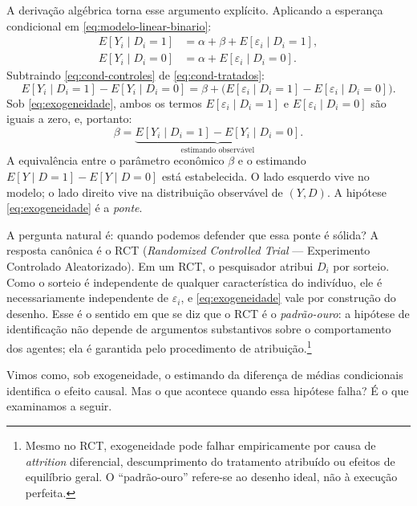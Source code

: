 A derivação algébrica torna esse argumento explícito. Aplicando a esperança condicional em \eqref{eq:modelo-linear-binario}:
\begin{align}
E[Y_i \mid D_i = 1] &= \alpha + \beta + E[\varepsilon_i \mid D_i = 1], \label{eq:cond-tratados}\\
E[Y_i \mid D_i = 0] &= \alpha + E[\varepsilon_i \mid D_i = 0]. \label{eq:cond-controles}
\end{align}
Subtraindo \eqref{eq:cond-controles} de \eqref{eq:cond-tratados}:
\begin{equation}
E[Y_i \mid D_i = 1] - E[Y_i \mid D_i = 0] = \beta + \big( E[\varepsilon_i \mid D_i = 1] - E[\varepsilon_i \mid D_i = 0] \big).
\label{eq:dec-bruta}
\end{equation}
Sob \eqref{eq:exogeneidade}, ambos os termos $E[\varepsilon_i \mid D_i = 1]$ e $E[\varepsilon_i \mid D_i = 0]$ são iguais a zero, e, portanto:
\begin{equation}
\beta = \underbrace{E[Y_i \mid D_i = 1] - E[Y_i \mid D_i = 0]}_{\text{estimando observável}}.
\label{eq:identificacao-rct}
\end{equation}
A equivalência entre o parâmetro econômico $\beta$ e o estimando $E[Y \mid D=1] - E[Y \mid D=0]$ está estabelecida. O lado esquerdo vive no modelo; o lado direito vive na distribuição observável de $(Y, D)$. A hipótese \eqref{eq:exogeneidade} é a \textit{ponte}.

A pergunta natural é: quando podemos defender que essa ponte é sólida? A resposta canônica é o RCT (\textit{Randomized Controlled Trial} --- Experimento Controlado Aleatorizado). Em um RCT, o pesquisador atribui $D_i$ por sorteio. Como o sorteio é independente de qualquer característica do indivíduo, ele é necessariamente independente de $\varepsilon_i$, e \eqref{eq:exogeneidade} vale por construção do desenho. Esse é o sentido em que se diz que o RCT é o \textit{padrão-ouro}: a hipótese de identificação não depende de argumentos substantivos sobre o comportamento dos agentes; ela é garantida pelo procedimento de atribuição.\footnote{Mesmo no RCT, exogeneidade pode falhar empiricamente por causa de \textit{attrition} diferencial, descumprimento do tratamento atribuído ou efeitos de equilíbrio geral. O ``padrão-ouro'' refere-se ao desenho ideal, não à execução perfeita.}

Vimos como, sob exogeneidade, o estimando da diferença de médias condicionais identifica o efeito causal. Mas o que acontece quando essa hipótese falha? É o que examinamos a seguir.

